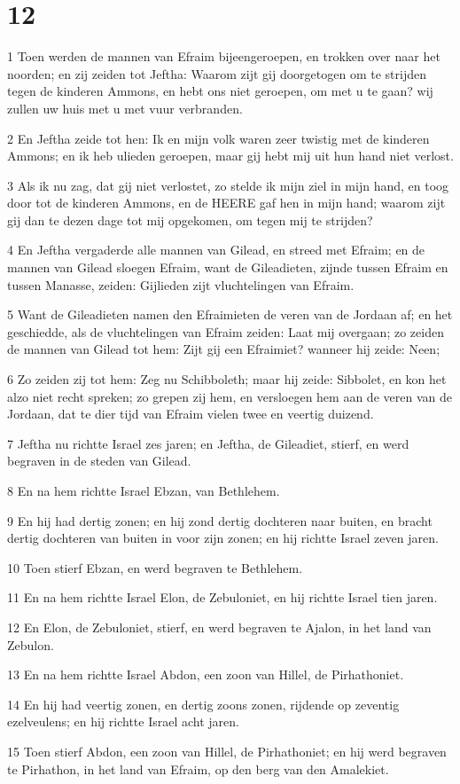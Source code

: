 \chapter{12}

\par 1 Toen werden de mannen van Efraim bijeengeroepen, en trokken over naar het noorden; en zij zeiden tot Jeftha: Waarom zijt gij doorgetogen om te strijden tegen de kinderen Ammons, en hebt ons niet geroepen, om met u te gaan? wij zullen uw huis met u met vuur verbranden.
\par 2 En Jeftha zeide tot hen: Ik en mijn volk waren zeer twistig met de kinderen Ammons; en ik heb ulieden geroepen, maar gij hebt mij uit hun hand niet verlost.
\par 3 Als ik nu zag, dat gij niet verlostet, zo stelde ik mijn ziel in mijn hand, en toog door tot de kinderen Ammons, en de HEERE gaf hen in mijn hand; waarom zijt gij dan te dezen dage tot mij opgekomen, om tegen mij te strijden?
\par 4 En Jeftha vergaderde alle mannen van Gilead, en streed met Efraim; en de mannen van Gilead sloegen Efraim, want de Gileadieten, zijnde tussen Efraim en tussen Manasse, zeiden: Gijlieden zijt vluchtelingen van Efraim.
\par 5 Want de Gileadieten namen den Efraimieten de veren van de Jordaan af; en het geschiedde, als de vluchtelingen van Efraim zeiden: Laat mij overgaan; zo zeiden de mannen van Gilead tot hem: Zijt gij een Efraimiet? wanneer hij zeide: Neen;
\par 6 Zo zeiden zij tot hem: Zeg nu Schibboleth; maar hij zeide: Sibbolet, en kon het alzo niet recht spreken; zo grepen zij hem, en versloegen hem aan de veren van de Jordaan, dat te dier tijd van Efraim vielen twee en veertig duizend.
\par 7 Jeftha nu richtte Israel zes jaren; en Jeftha, de Gileadiet, stierf, en werd begraven in de steden van Gilead.
\par 8 En na hem richtte Israel Ebzan, van Bethlehem.
\par 9 En hij had dertig zonen; en hij zond dertig dochteren naar buiten, en bracht dertig dochteren van buiten in voor zijn zonen; en hij richtte Israel zeven jaren.
\par 10 Toen stierf Ebzan, en werd begraven te Bethlehem.
\par 11 En na hem richtte Israel Elon, de Zebuloniet, en hij richtte Israel tien jaren.
\par 12 En Elon, de Zebuloniet, stierf, en werd begraven te Ajalon, in het land van Zebulon.
\par 13 En na hem richtte Israel Abdon, een zoon van Hillel, de Pirhathoniet.
\par 14 En hij had veertig zonen, en dertig zoons zonen, rijdende op zeventig ezelveulens; en hij richtte Israel acht jaren.
\par 15 Toen stierf Abdon, een zoon van Hillel, de Pirhathoniet; en hij werd begraven te Pirhathon, in het land van Efraim, op den berg van den Amalekiet.

